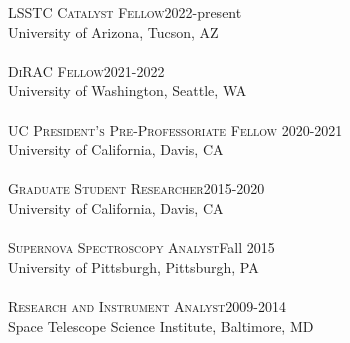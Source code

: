 \documentclass[10pt]{cv}
\begin{document}
\begin{llist}
\vspace{-0.1in}   
   \textsc{LSSTC Catalyst Fellow}\hfill2022-present\\
   University of Arizona, Tucson, AZ\\
   \vspace{-0.05in}  
\\
   \textsc{DiRAC Fellow}\hfill2021-2022\\
   University of Washington, Seattle, WA\\
   \vspace{-0.05in}  
\\
   \textsc{UC President's Pre-Professoriate Fellow} \hfill 2020-2021\\
   University of California, Davis, CA\\
   \vspace{-0.05in}  
\\
    \textsc{Graduate Student Researcher}\hfill2015-2020\\
    University of California, Davis, CA\\
    \vspace{-0.05in}  
\\
\textsc{Supernova Spectroscopy Analyst}\hfill Fall 2015\\ 
University of Pittsburgh, Pittsburgh, PA\\
\vspace{-0.05in}  
\\
\textsc{Research and Instrument Analyst}\hfill 2009-2014 \\
Space Telescope Science Institute, Baltimore, MD\\


\end{llist}
\end{document}
